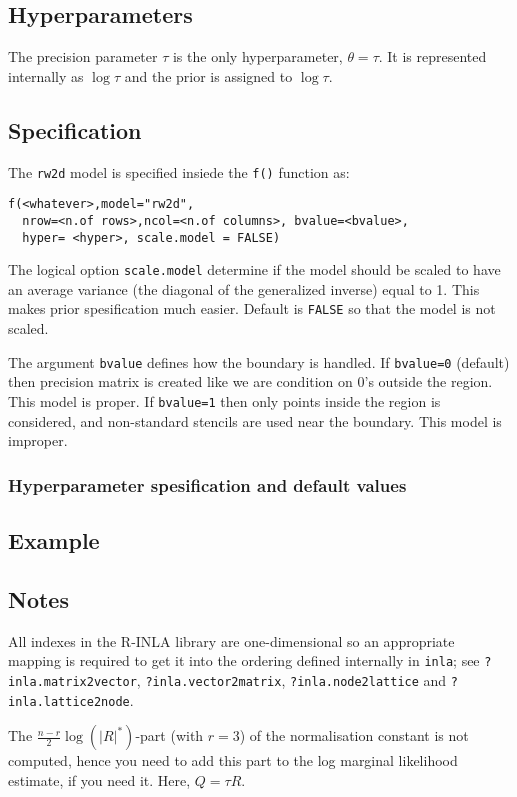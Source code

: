 \documentclass[a4paper,11pt]{article}
\begin{document}
\subsection*{Hyperparameters}

The precision parameter $\tau$ is the only hyperparameter, $\theta =
\tau$. It is represented internally as $\log\tau$ and the prior is
assigned to $\log\tau$.

\subsection*{Specification}

The {\tt rw2d} model is specified insiede the {\tt f()} function as:
\begin{verbatim}
f(<whatever>,model="rw2d",
  nrow=<n.of rows>,ncol=<n.of columns>, bvalue=<bvalue>,
  hyper= <hyper>, scale.model = FALSE)
\end{verbatim}

The logical option \verb|scale.model| determine if the model should be
scaled to have an average variance (the diagonal of the generalized
inverse) equal to 1. This makes prior spesification much
easier. Default is \verb|FALSE| so that the model is not scaled.

The argument \verb|bvalue| defines how the boundary is handled. If
\verb|bvalue=0| (default) then precision matrix is created like we are
condition on $0$'s outside the region. This model is proper. If
\verb|bvalue=1| then only points inside the region is considered, and
non-standard stencils are used near the boundary. This model is
improper.


\subsubsection*{Hyperparameter spesification and default values}


\subsection*{Example}



\subsection*{Notes}
All indexes in the R-INLA library are one-dimensional so an
appropriate mapping is required to get it into the ordering defined
internally in \verb|inla|; see \verb|?inla.matrix2vector|,
\verb|?inla.vector2matrix|, \verb|?inla.node2lattice| and
\verb|?inla.lattice2node|.


The $\frac{n-r}{2}\log(|R|^{*})$-part (with $r=3$) of the
normalisation constant is not computed, hence you need to add this
part to the log marginal likelihood estimate, if you need it. Here,
$Q=\tau R$. 


{\small}
\end{document}
